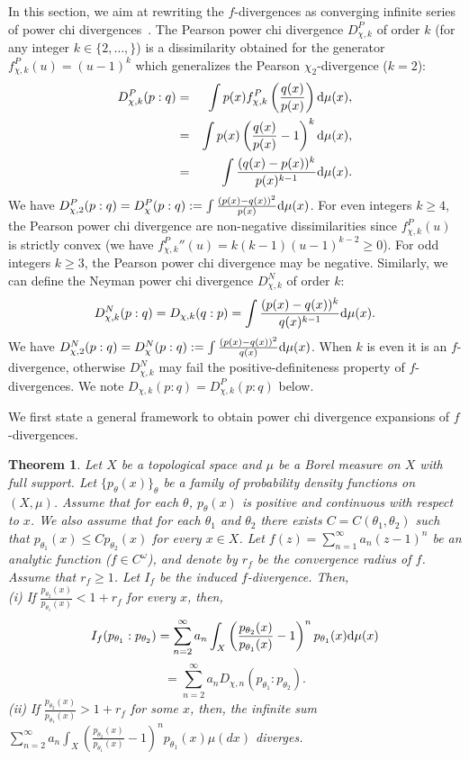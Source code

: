 \documentclass[journal]{IEEEtran}
\newtheorem{theorem}{Theorem}
\begin{document}
In this section, we aim at rewriting the $f$-divergences as converging infinite series of power chi divergences~\cite{fdivchi-2013,nielsen2019power}.
The Pearson power chi divergence $D_{\chi,k}^P$ of order $k$ (for any integer $k\in\{2,\ldots,\}$) is a dissimilarity obtained for the generator $f_{\chi,k}^P(u)=(u-1)^k$ which generalizes the Pearson $\chi_2$-divergence ($k=2$):
\begin{eqnarray*}
D_{\chi,k}^P(p:q) &=& \int p(x)f_{\chi,k}^P\left(\frac{q(x)}{p(x)}\right)\mathrm{d}\mu(x),\\
&=& \int p(x)\left(\frac{q(x)}{p(x)}-1\right)^k \mathrm{d}\mu(x),\\
&=& \int  \frac{(q(x)-p(x))^k}{p(x)^{k-1}} \mathrm{d}\mu(x).
\end{eqnarray*}
We have $D_{\chi,2}^P(p:q)=D_\chi^P(p:q):=\int \frac{(p(x)-q(x))^2}{p(x)}\mathrm{d}\mu(x)$.
For even integers $k\geq 4$, the Pearson power chi divergence are non-negative dissimilarities 
since $f_{\chi,k}^P(u)$ is strictly convex  (we have ${f_{\chi,k}^P}''(u)=k(k-1)(u-1)^{k-2}\geq 0$).
For odd integers $k\geq 3$, the Pearson power chi divergence may be negative.
Similarly, we can define the Neyman power chi divergence $D_{\chi,k}^N$ of order $k$:
$$
D_{\chi,k}^N(p:q) = D_{\chi,k}(q:p)= \int  \frac{(p(x)-q(x))^k}{q(x)^{k-1}} \mathrm{d}\mu(x).
$$
We have $D_{\chi,2}^N(p:q)=D_\chi^N(p:q):=\int \frac{(p(x)-q(x))^2}{q(x)}\mathrm{d}\mu(x)$. 
When $k$ is even it is an $f$-divergence, otherwise $D_{\chi,k}^N$ may fail the positive-definiteness property of $f$-divergences.
We note $D_{\chi,k}(p:q)=D_{\chi,k}^P(p:q)$ below.

We first state a general framework to obtain power chi divergence expansions of $f$-divergences. 

\begin{theorem}\label{thm:div-expansion}
Let $X$ be a topological space and $\mu$ be a Borel measure on $X$ with full support. 
Let $\{p_{\theta}(x)\}_{\theta}$ be a family of probability density functions on $(X, \mu)$. 
Assume that for each $\theta$, 
$p_{\theta}(x)$ is positive and continuous with respect to $x$. 
We also assume that for each $\theta_1$ and $\theta_2$ there exists 
$C = C(\theta_1, \theta_2)$ such that $p_{\theta_1}(x) \le C p_{\theta_2}(x)$ for every $x \in X$. 
Let $f(z) = \sum_{n=1}^{\infty} a_n (z-1)^n$ be an analytic function ($f\in C^\omega$), and denote by $r_f$ be the convergence radius of $f$. 
Assume that $r_f \ge 1$. 
Let $I_f$ be the induced $f$-divergence. 
Then, \\
(i) If $\displaystyle\frac{p_{\theta_2}(x)}{p_{\theta_1}(x)} < 1+r_f$ for every $x$, then, 
\[ I_f (p_{\theta_1} : p_{\theta_2}) = \sum_{n=2}^{\infty} a_n \int_{X}  \left( \frac{p_{\theta_2}(x)}{p_{\theta_1}(x)} - 1 \right)^n p_{\theta_1}(x) \mathrm{d}\mu(x)\]
\[ =\sum_{n=2}^{\infty} a_n D_{\chi,n}(p_{\theta_1} : p_{\theta_2}). \]
(ii) If $\displaystyle\frac{p_{\theta_2}(x)}{p_{\theta_1}(x)} > 1+r_f$ for some $x$, then, 
the infinite sum \\
$\displaystyle \sum_{n=2}^{\infty} a_n \int_{X} \left( \frac{p_{\theta_2}(x)}{p_{\theta_1}(x)} - 1 \right)^n p_{\theta_1}(x) \mu(dx)$ diverges. 
\end{theorem}
\end{document}
